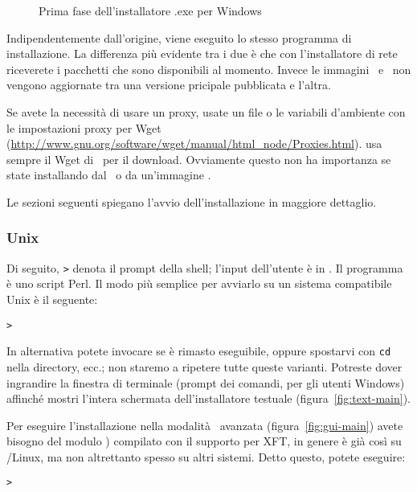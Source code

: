 \documentclass{article}
\begin{document}
\begin{figure}[tb]
\caption{Prima fase dell'installatore .exe per Windows}\label{fig:nsis}
\end{figure}

Indipendentemente dall'origine, viene eseguito lo stesso programma di
installazione. La differenza più evidente tra i due è che con l'installatore
di rete riceverete i pacchetti che sono disponibili al momento. Invece
le immagini \DVD\ e \ISO\ non vengono aggiornate tra una versione 
pricipale pubblicata e l'altra.

Se avete la necessità di usare un proxy, usate un file
 o le variabili d'ambiente con le impostazioni proxy
per Wget
(\url{http://www.gnu.org/software/wget/manual/html_node/Proxies.html}).
\TL{} usa sempre il Wget di \GNU\ per il download. Ovviamente questo non
ha importanza se state installando dal \DVD\ o da un'immagine \ISO.

\noindent
Le sezioni seguenti spiegano l'avvio dell'installazione in maggiore
dettaglio.

\subsubsection{Unix}

Di seguito, \texttt{>} denota il prompt della shell; l'input dell'utente è
in .
Il programma  è uno script Perl. Il modo più semplice
per avviarlo su un sistema compatibile Unix è il seguente:
\begin{alltt}
> 
\end{alltt}
In alternativa potete invocare
 se è rimasto eseguibile,
oppure spostarvi con \texttt{cd} nella directory, ecc.; non staremo a ripetere
tutte queste varianti. Potreste dover ingrandire la finestra di terminale
(prompt dei comandi, per gli utenti Windows)
affinché mostri l'intera schermata dell'installatore testuale
(figura~\ref{fig:text-main}).

Per eseguire l'installazione nella modalità \GUI\ avanzata
(figura~\ref{fig:gui-main}) avete bisogno del modulo )
compilato con il supporto per XFT, in genere è già così su
\GNU/Linux, ma non altrettanto spesso su altri sistemi. Detto questo, potete
eseguire:
\begin{alltt}
> 
\end{alltt}
\end{document}
